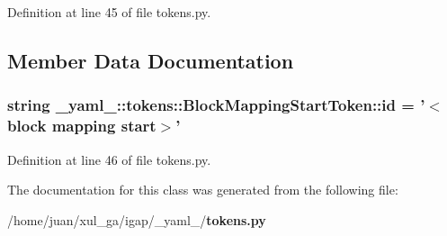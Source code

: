Definition at line 45 of file tokens.py.

\subsection{Member Data Documentation}
\subsubsection{\setlength{\rightskip}{0pt plus 5cm}string {\bf \_\-yaml\_\-::tokens::BlockMappingStartToken::id} = '$<$block mapping start$>$'\hspace{0.3cm}{\tt  [static]}}\label{class__yaml___1_1tokens_1_1BlockMappingStartToken_48391a417b54aafc061673e7d4442fae}




Definition at line 46 of file tokens.py.

The documentation for this class was generated from the following file:\begin{CompactItemize}
\item 
/home/juan/xul\_\-ga/igap/\_\-yaml\_\-/{\bf tokens.py}\end{CompactItemize}

